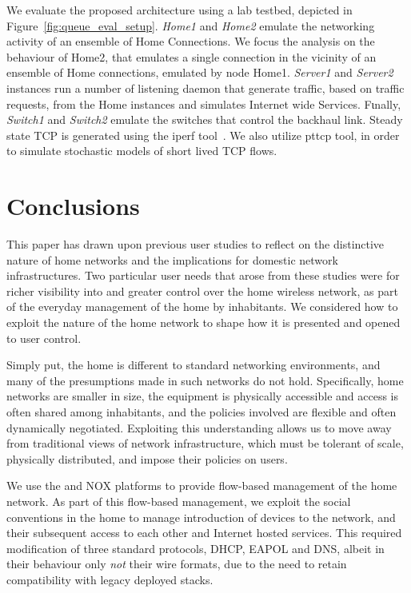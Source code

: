 We evaluate the proposed architecture using a lab testbed, depicted in
Figure~\ref{fig:queue_eval_setup}. {\it Home1} and {\it Home2} emulate the
networking activity of an ensemble of Home Connections. We focus the
analysis on the behaviour of Home2, that emulates a single connection in the
vicinity of an ensemble of Home connections, emulated by node Home1. 
{\it Server1} and {\it Server2} instances run a number of listening daemon that
generate traffic, based on traffic requests, from the Home instances and
simulates Internet wide Services. Fιnally, {\it Switch1} and {\it  Switch2}
emulate the switches that control the backhaul link. Steady state TCP is
generated using the iperf tool~\cite{iperf}. We also utilize pttcp tool, in
order to simulate stochastic models of short lived TCP flows. 

\section{Conclusions} \label{s:conclusion}

This paper has drawn upon previous user studies to reflect on the distinctive
nature of home networks and the implications for domestic network
infrastructures.  Two particular user needs that arose from these studies were
for richer visibility into and greater control over the home wireless network,
as part of the everyday management of the home by inhabitants.  We  considered
how to exploit the nature of the home network to shape how it is presented and
opened to user control.  

Simply put, the home is different to standard networking environments, and
many of the presumptions made in such networks do not hold.  Specifically,
home networks are smaller in size, the equipment is physically accessible and
access is often shared among inhabitants, and the policies involved are
flexible and often dynamically negotiated.  Exploiting this understanding
allows us to move away from traditional views of network infrastructure, which
must be tolerant of scale, physically distributed, and impose their policies
on users. 

We use the \ovs and NOX platforms to provide flow-based management of
the home network.  As part of this flow-based management, we exploit the
social conventions in the home to manage introduction of devices  to the
network, and their subsequent access to each other and Internet hosted
services.  This required modification of three standard protocols, DHCP, EAPOL
and DNS, albeit in their behaviour only \emph{not} their wire formats, due to
the need to retain compatibility with legacy deployed stacks.
                                                         
